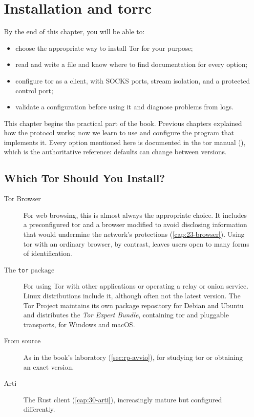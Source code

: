\chapter{Installation and torrc}\label{cap:17-torrc}

\begin{obiettivi}
By the end of this chapter, you will be able to:
\begin{itemize}[nosep]
  \item choose the appropriate way to install Tor for your purpose;
  \item read and write a  file and know where to find documentation for every option;
  \item configure tor as a client, with SOCKS ports, stream isolation, and a protected control port;
  \item validate a configuration before using it and diagnose problems from logs.
\end{itemize}
\end{obiettivi}

This chapter begins the practical part of the book. Previous chapters explained how the protocol works; now we learn to use and configure the program that implements it. Every option mentioned here is documented in the tor manual (), which is the authoritative reference: defaults can change between versions.

\section{Which Tor Should You Install?}\label{sec:torrc-installare}

\begin{description}
  \item[Tor Browser] For web browsing, this is almost always the appropriate choice. It includes a preconfigured tor and a browser modified to avoid disclosing information that would undermine the network's protections (\cref{cap:23-browser}). Using tor with an ordinary browser, by contrast, leaves users open to many forms of identification.
  \item[The \texttt{tor} package] For using Tor with other applications or operating a relay or onion service. Linux distributions include it, although often not the latest version. The Tor Project maintains its own package repository for Debian and Ubuntu and distributes the \emph{Tor Expert Bundle}, containing tor and pluggable transports, for Windows and macOS.
  \item[From source] As in the book's laboratory (\cref{sec:rp-avvio}), for studying tor or obtaining an exact version.
  \item[Arti] The Rust client (\cref{cap:30-arti}), increasingly mature but configured differently.
\end{description}

